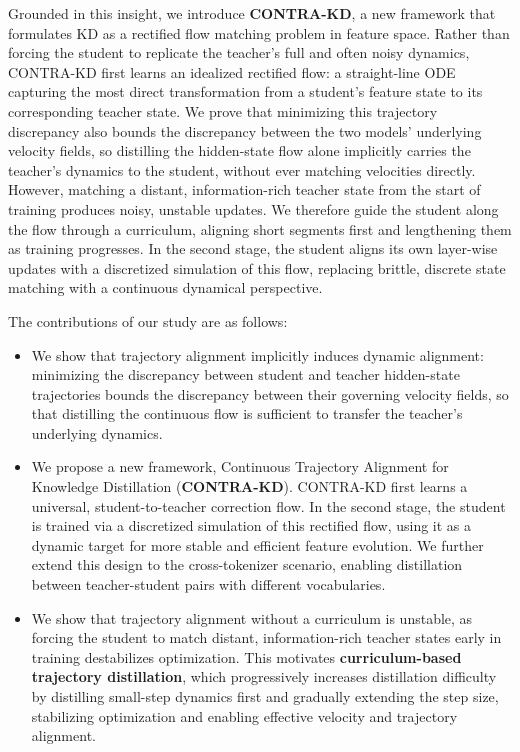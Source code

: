 \documentclass{article} %
\theoremstyle{definition}
\theoremstyle{remark}
\begin{document}
Grounded in this insight, we introduce \textbf{CONTRA-KD}, a new framework that formulates KD as a rectified flow matching problem in feature space. Rather than forcing the student to replicate the teacher's full and often noisy dynamics, CONTRA-KD first learns an idealized rectified flow: a straight-line ODE capturing the most direct transformation from a student's feature state to its corresponding teacher state. We prove that minimizing this trajectory discrepancy also bounds the discrepancy between the two models' underlying velocity fields, so distilling the hidden-state flow alone implicitly carries the teacher's dynamics to the student, without ever matching velocities directly. However, matching a distant, information-rich teacher state from the start of training produces noisy, unstable updates. We therefore guide the student along the flow through a curriculum, aligning short segments first and lengthening them as training progresses. In the second stage, the student aligns its own layer-wise updates with a discretized simulation of this flow, replacing brittle, discrete state matching with a continuous dynamical perspective.

The contributions of our study are as follows:
\begin{itemize}
    \item We show that trajectory alignment implicitly induces dynamic alignment: minimizing the discrepancy between student and teacher hidden-state trajectories bounds the discrepancy between their governing velocity fields, so that distilling the continuous flow is sufficient to transfer the teacher's underlying dynamics.
    \item We propose a new framework, Continuous Trajectory Alignment for Knowledge Distillation (\textbf{CONTRA-KD}). CONTRA-KD first learns a universal, student-to-teacher correction flow. In the second stage, the student is trained via a discretized simulation of this rectified flow, using it as a dynamic target for more stable and efficient feature evolution. We further extend this design to the cross-tokenizer scenario, enabling distillation between teacher-student pairs with different vocabularies.
    \item We show that trajectory alignment without a curriculum is unstable, as forcing the student to match distant, information-rich teacher states early in training destabilizes optimization. This motivates \textbf{curriculum-based trajectory distillation}, which progressively increases distillation difficulty by distilling small-step dynamics first and gradually extending the step size, stabilizing optimization and enabling effective velocity and trajectory alignment.
\end{itemize}
\end{document}
